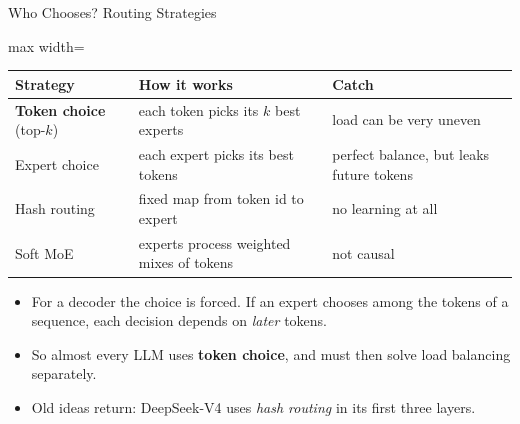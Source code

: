 \begin{frame}{Who Chooses? Routing Strategies}
    \begin{center}
    \small
    \renewcommand{\arraystretch}{1.25}
    \begin{adjustbox}{max width=\linewidth}\begin{tabular}{>{\raggedright\arraybackslash}p{3.2cm}>{\raggedright\arraybackslash}p{5.2cm}>{\raggedright\arraybackslash}p{4.6cm}}
        \toprule
        \textbf{Strategy} & \textbf{How it works} & \textbf{Catch} \\
        \midrule
        \rowcolor{KAUSTcyan!12} \textbf{Token choice} (top-$k$) & each token picks its $k$ best experts & load can be very uneven \\
        Expert choice & each expert picks its best tokens & perfect balance, but \alert{leaks future tokens} \\
        Hash routing & fixed map from token id to expert & no learning at all \\
        Soft MoE & experts process weighted mixes of tokens & not causal \\
        \bottomrule
    \end{tabular}\end{adjustbox}
    \end{center}
    \begin{itemize}\itemsep0.4em
        \item For a decoder the choice is forced. If an expert chooses among the tokens of a sequence, each decision depends on \emph{later} tokens.
        \item So almost every LLM uses \textbf{token choice}, and must then solve load balancing separately.
        \item Old ideas return: DeepSeek-V4 uses \emph{hash routing} in its first three layers.
    \end{itemize}
\end{frame}

